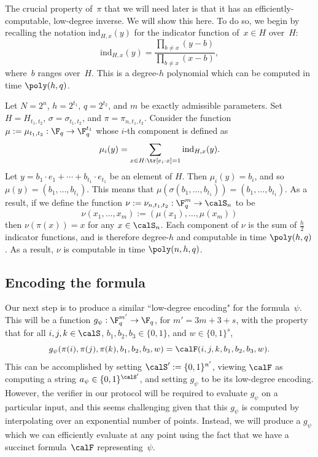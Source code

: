 \documentclass[11pt]{article}
\newcommand{\indicator}[3]{\mathrm{ind}_{#1,#2}(#3)}
\begin{document}
The crucial property of~$\pi$ that we will need later is that it has an efficiently-computable, low-degree inverse.
We will show this here.
To do so, we begin by recalling the notation $\indicator{H}{x}{y}$ for the indicator function of~$x \in H$ over~$H$:
\begin{equation*}
\indicator{H}{x}{y} = \frac{\prod_{b \neq x}(y - b)}{\prod_{b \neq x}(x-b)},
\end{equation*}
where~$b$ ranges over~$H$.
This is a degree-$h$ polynomial which can be computed in time $\poly(h, q)$.
\begin{definition}
Let $N= 2^n$, $h = 2^{t_1}$, $q= 2^{t_2}$, and $m$ be exactly admissible parameters.
Set $H = H_{t_1, t_2}$, $\sigma = \sigma_{t_1, t_2}$, and $\pi = \pi_{n, t_1, t_2}$.
Consider the function $\mu:= \mu_{t_1, t_2}:\F_q \rightarrow \F_q^{t_1}$ whose $i$-th component is defined as
\begin{equation*}
\mu_i(y) = \sum_{x \in H : \tr[e_i \cdot x] = 1} \indicator{H}{x}{y}.
\end{equation*}
Let $y = b_1 \cdot e_1 + \cdots + b_{t_1} \cdot e_{t_1}$ be an element of $H$.
Then $\mu_i(y) = b_i$, and so $\mu(y) = (b_1, \ldots, b_{t_1})$.
This means that $\mu(\sigma(b_1, \ldots, b_{t_1})) = (b_1, \ldots, b_{t_1})$.
As a result, if we define the function $\nu := \nu_{n, t_1, t_2} : \F_q^m \rightarrow \calS_n$ to be
\begin{equation*}
\nu(x_1, \ldots, x_m) := (\mu(x_1), \ldots, \mu(x_m))
\end{equation*}
then $\nu(\pi(x)) = x$ for any $x \in \calS_n$.
Each component of $\nu$ is the sum of $\frac{h}{2}$ indicator functions,
and is therefore degree-$h$ and computable in time $\poly(h,q)$.
As a result, $\nu$ is computable in time $\poly(n,h,q)$.
\end{definition}


\subsection{Encoding the formula}

Our next step is to produce a similar ``low-degree encoding" for the formula~$\psi$.
This will be a function $g_\psi: \F_q^{m'} \rightarrow \F_q$, for $m' = 3m + 3+s$, with the property that for all $i, j, k \in \calS$, $b_1, b_2, b_3 \in \{0, 1\}$, and $w \in \{0, 1\}^s$,
\begin{equation*}
g_\psi(\pi(i), \pi(j), \pi(k), b_1, b_2, b_3, w) = \calF(i, j, k, b_1, b_2, b_3, w).
\end{equation*}
This can be accomplished by setting $\calS' := \{0, 1\}^{n'}$, viewing $\calF$ as computing a string $a_{\psi} \in \{0, 1\}^{\calS'}$, and setting $g_{\psi}$ to be its low-degree encoding.
However, the verifier in our protocol will be required to evaluate $g_\psi$ on a particular input,
and this seems challenging given that this $g_{\psi}$ is computed by interpolating over an exponential number of points.
Instead, we will produce a $g_\psi$ which we can efficiently evaluate at any point using the fact that we have a succinct formula~$\calF$ representing~$\psi$.
\end{document}
